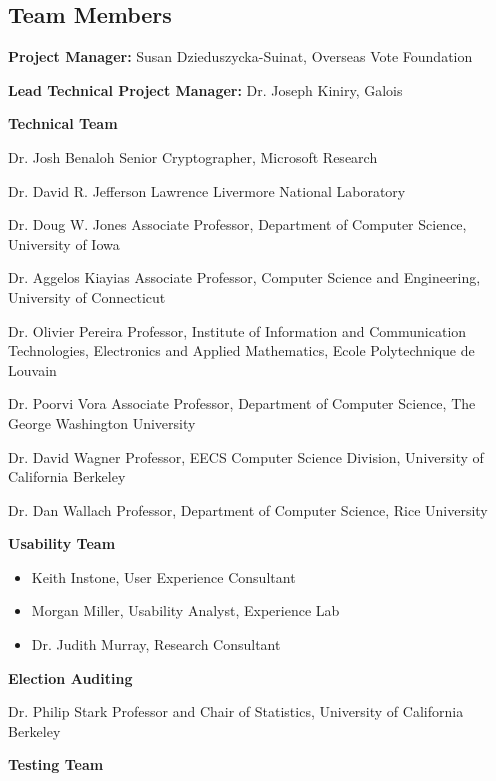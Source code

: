 \subsection{Team Members}
\label{sec:team-members}

\textbf{Project Manager:} Susan Dzieduszycka-Suinat, Overseas Vote Foundation

\textbf{Lead Technical Project Manager:} Dr. Joseph Kiniry, Galois

\textbf{Technical Team}

Dr. Josh Benaloh
Senior Cryptographer, Microsoft Research
 
Dr. David R. Jefferson
Lawrence Livermore National Laboratory
 
Dr. Doug W. Jones
Associate Professor, Department of Computer Science, University of Iowa
 
Dr. Aggelos Kiayias
Associate Professor, Computer Science and Engineering, University of Connecticut
 
Dr. Olivier Pereira
Professor, Institute of Information and Communication Technologies, Electronics and Applied Mathematics, Ecole Polytechnique de Louvain
 
Dr. Poorvi Vora
Associate Professor, Department of Computer Science, The George Washington University
 
Dr. David Wagner
Professor, EECS Computer Science Division, University of California Berkeley
 
Dr. Dan Wallach
Professor, Department of Computer Science, Rice University
 
\textbf{Usability Team}

\begin{itemize}
\item Keith Instone, User Experience Consultant
\item Morgan Miller, Usability Analyst, Experience Lab
\item Dr. Judith Murray, Research Consultant
\end{itemize}

\textbf{Election Auditing}

Dr. Philip Stark
Professor and Chair of Statistics, University of California Berkeley
 
\textbf{Testing Team}

